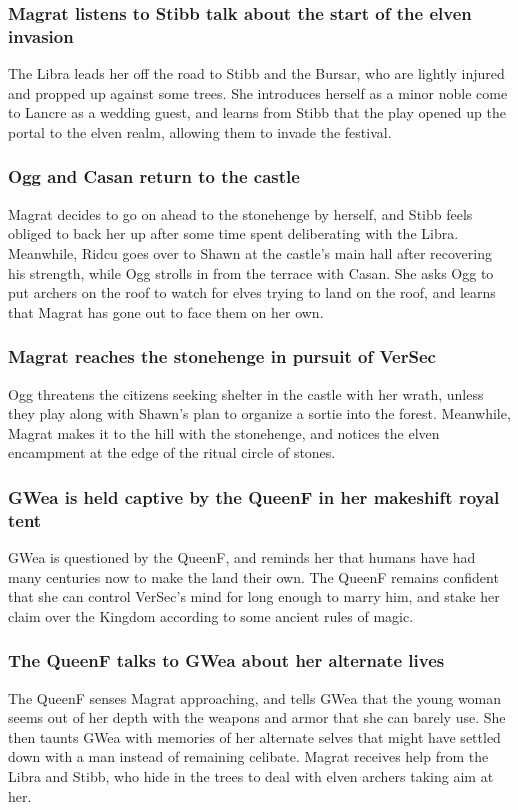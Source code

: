 \subsubsection{\Gls{Magrat} listens to \Gls{Stibb} talk about the start of the elven invasion}
The \Gls{Libra} leads her off the road to \Gls{Stibb} and the \Gls{Bursar}, who are lightly injured
and propped up against some trees. She introduces herself as a minor noble come to Lancre as a
wedding guest, and learns from \Gls{Stibb} that the play opened up the portal to the elven realm,
allowing them to invade the festival.

\subsubsection{\Gls{Ogg} and \Gls{Casan} return to the castle}
\Gls{Magrat} decides to go on ahead to the stonehenge by herself, and \Gls{Stibb} feels obliged to
back her up after some time spent deliberating with the \Gls{Libra}. Meanwhile, \Gls{Ridcu} goes
over to \Gls{Shawn} at the castle's main hall after recovering his strength, while \Gls{Ogg} strolls
in from the terrace with \Gls{Casan}. She asks \Gls{Ogg} to put archers on the roof to watch for
elves trying to land on the roof, and learns that \Gls{Magrat} has gone out to face them on her own.

\subsubsection{\Gls{Magrat} reaches the stonehenge in pursuit of \Gls{VerSec}}
\Gls{Ogg} threatens the citizens seeking shelter in the castle with her wrath, unless they play
along with \Gls{Shawn}'s plan to organize a sortie into the forest. Meanwhile, \Gls{Magrat} makes
it to the hill with the stonehenge, and notices the elven encampment at the edge of the ritual
circle of stones.

\subsubsection{\Gls{GWea} is held captive by the \Gls{QueenF} in her makeshift royal tent}
\Gls{GWea} is questioned by the \Gls{QueenF}, and reminds her that humans have had many centuries
now to make the land their own. The \Gls{QueenF} remains confident that she can control
\Gls{VerSec}'s mind for long enough to marry him, and stake her claim over the Kingdom according to
some ancient rules of magic.

\subsubsection{The \Gls{QueenF} talks to \Gls{GWea} about her alternate lives}
The \Gls{QueenF} senses \Gls{Magrat} approaching, and tells \Gls{GWea} that the young woman seems
out of her depth with the weapons and armor that she can barely use. She then taunts \Gls{GWea} with
memories of her alternate selves that might have settled down with a man instead of remaining
celibate. \Gls{Magrat} receives help from the \Gls{Libra} and \Gls{Stibb}, who hide in the trees to
deal with elven archers taking aim at her.

